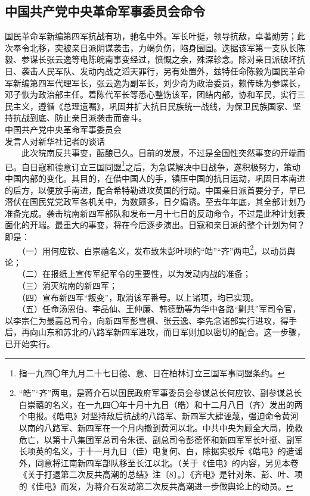 \documentclass[cn,11pt,chinese]{elegantbook}
\def\myformat#1{\hfil\hfil #1}
\begin{document}
\subsection*{\myformat{中国共产党中央革命军事委员会命令}}
国民革命军新编第四军抗战有功，驰名中外。军长叶挺，领导抗敌，卓著勋劳；此次奉令北移，突被亲日派阴谋袭击，力竭负伤，陷身囹圄。迭据该军第一支队长陈毅、参谋长张云逸等电陈皖南事变经过，愤慨之余，殊深轸念。除对亲日派破坏抗日、袭击人民军队、发动内战之滔天罪行，另有处置外，兹特任命陈毅为国民革命军新编第四军代理军长，张云逸为副军长，刘少奇为政治委员，赖传珠为参谋长，邓子恢为政治部主任。着陈代军长等悉心整饬该军，团结内部，协和军民，实行三民主义，遵循《总理遗嘱》，巩固并扩大抗日民族统一战线，为保卫民族国家、坚持抗战到底、防止亲日派袭击而奋斗。\\
中国共产党中央革命军事委员会\\
发言人对新华社记者的谈话\\
　　此次皖南反共事变，酝酿已久。目前的发展，不过是全国性突然事变的开端而已。自日寇和德意订立三国同盟\footnote[1]{ 指一九四〇年九月二十七日德、意、日在柏林订立三国军事同盟条约。}之后，为急谋解决中日战争，遂积极努力，策动中国内部的变化。其目的，在借中国人的手，镇压中国的抗日运动，巩固日本南进的后方，以便放手南进，配合希特勒进攻英国的行动。中国亲日派首要分子，早已潜伏在国民党党政军各机关中，为数颇多，日夕煽诱。至去年年底，其全部计划乃准备完成。袭击皖南新四军部队和发布一月十七日的反动命令，不过是此种计划表面化的开端。最重大的事变，将在今后逐步演出。日寇和亲日派的整个计划为何？即是：\\
　　（一）用何应钦、白崇禧名义，发布致朱彭叶项的“皓”“齐”两电\footnote[2]{ “皓”“齐”两电，是蒋介石以国民政府军事委员会参谋总长何应钦、副参谋总长白崇禧的名义，在一九四〇年十月十九日（皓）和十二月八日（齐）发出的两个电报。《皓电》对坚持敌后抗战的八路军、新四军大肆诬蔑，强迫命令黄河以南的八路军、新四军在一个月内撤到黄河以北。中共中央为顾全大局，挽救危亡，以第十八集团军总司令朱德、副总司令彭德怀和新四军军长叶挺、副军长项英的名义，于十一月九日（佳）电复何、白，除据实驳斥《皓电》的造谣外，同意将江南新四军部队移至长江以北。（关于《佳电》的内容，另见本卷《关于打退第二次反共高潮的总结》注〔8〕。）《齐电》是针对朱、彭、叶、项的《佳电》而发，为蒋介石发动第二次反共高潮进一步做舆论上的动员。}，以动员舆论；\\
　　（二）在报纸上宣传军纪军令的重要性，以为发动内战的准备；\\
　　（三）消灭皖南的新四军；\\
　　（四）宣布新四军“叛变”，取消该军番号。以上诸项，均已实现。\\
　　（五）任命汤恩伯、李品仙、王仲廉、韩德勤等为华中各路“剿共”军司令官，以李宗仁为最高总司令，向新四军彭雪枫、张云逸、李先念诸部实行进攻，得手后，再向山东和苏北的八路军新四军进攻，而日军则加以密切的配合。这一步骤，已开始实行。\\
\end{document}
